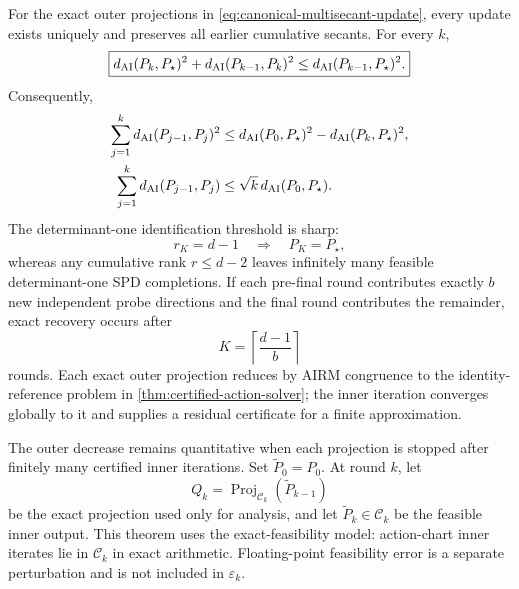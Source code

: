 \begin{theorem}
\label{thm:nested-multisecant}
For the exact outer projections in \eqref{eq:canonical-multisecant-update},
every update exists uniquely and
preserves all earlier cumulative secants.  For every \(k\),
\begin{equation}
  \boxed{
  d_{\mathrm{AI}}(P_k,P_\star)^2+
  d_{\mathrm{AI}}(P_{k-1},P_k)^2
  \le d_{\mathrm{AI}}(P_{k-1},P_\star)^2.}
  \label{eq:multisecant-pythagorean}
\end{equation}
Consequently,
\begin{align}
  \sum_{j=1}^kd_{\mathrm{AI}}(P_{j-1},P_j)^2
  &\le d_{\mathrm{AI}}(P_0,P_\star)^2-
       d_{\mathrm{AI}}(P_k,P_\star)^2,
  \label{eq:multisecant-energy}\\
  \sum_{j=1}^kd_{\mathrm{AI}}(P_{j-1},P_j)
  &\le\sqrt{k}\,d_{\mathrm{AI}}(P_0,P_\star).
  \label{eq:multisecant-length}
\end{align}
The determinant-one identification threshold is sharp:
\begin{equation}
  r_K=d-1\quad\Longrightarrow\quad P_K=P_\star,
  \label{eq:sharp-identification-sufficiency}
\end{equation}
whereas any cumulative rank \(r\le d-2\) leaves infinitely many feasible
determinant-one SPD completions.  If each pre-final round contributes exactly
\(b\) new independent probe directions and the final round contributes the
remainder, exact recovery occurs after
\begin{equation}
  K=\left\lceil\frac{d-1}{b}\right\rceil
  \label{eq:block-identification-rounds}
\end{equation}
rounds.  Each exact outer projection reduces by AIRM congruence to the
identity-reference problem in \cref{thm:certified-action-solver}; the inner
iteration converges globally to it and supplies a residual certificate for a
finite approximation.
\end{theorem}

The outer decrease remains quantitative when each projection is stopped after
finitely many certified inner iterations.  Set \(\widetilde P_0=P_0\).  At
round \(k\), let
\[
  Q_k=\operatorname{Proj}_{\mathscr C_k}(\widetilde P_{k-1})
\]
be the exact projection used only for analysis, and let
\(\widetilde P_k\in\mathscr C_k\) be the feasible inner output.  This theorem
uses the exact-feasibility model: action-chart inner iterates lie in
\(\mathscr C_k\) in exact arithmetic.  Floating-point feasibility error is a
separate perturbation and is not included in \(\varepsilon_k\).

